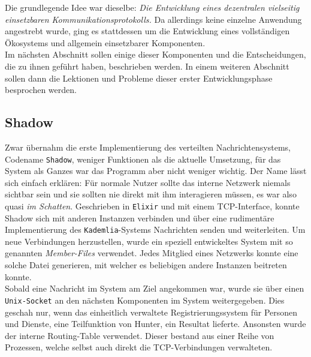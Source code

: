 \documentclass[a4paper,11pt,titlepage,twoside]{memoir}
\begin{document}
\noindent Die grundlegende Idee war dieselbe: \emph{Die Entwicklung eines
dezentralen vielseitig einsetzbaren Kommunikationsprotokolls.} Da
allerdings keine einzelne Anwendung angestrebt wurde, ging es
stattdessen um die Entwicklung eines vollständigen Ökosystems und
allgemein einsetzbarer Komponenten.\\

\noindent Im nächsten Abschnitt sollen einige dieser Komponenten und
die Entscheidungen, die zu ihnen geführt haben, beschrieben werden. In
einem weiteren Abschnitt sollen dann die Lektionen und Probleme dieser
erster Entwicklungsphase besprochen werden.
\subsection{Shadow}
\label{sec:orgc47246c}
Zwar übernahm die erste Implementierung des verteilten
Nachrichtensystems, Codename \texttt{Shadow}, weniger Funktionen als die
aktuelle Umsetzung, für das System als Ganzes war das Programm aber
nicht weniger wichtig. Der Name lässt sich einfach erklären: Für
normale Nutzer sollte das interne Netzwerk niemals sichtbar sein und
sie sollten nie direkt mit ihm interagieren müssen, es war also quasi
\emph{im Schatten}. Geschrieben in \texttt{Elixir} und mit einem TCP-Interface, konnte
Shadow sich mit anderen Instanzen verbinden und über eine rudimentäre
Implementierung des \texttt{Kademlia}-Systems Nachrichten senden und
weiterleiten. Um neue Verbindungen herzustellen, wurde ein speziell
entwickeltes System mit so genannten \emph{Member-Files} verwendet. Jedes
Mitglied eines Netzwerks konnte eine solche Datei generieren, mit
welcher es beliebigen andere Instanzen beitreten konnte.\\

\noindent Sobald eine Nachricht im System am Ziel angekommen war,
wurde sie über einen \texttt{Unix-Socket} an den nächsten Komponenten im System
weitergegeben. Dies geschah nur, wenn das einheitlich verwaltete
Registrierungssystem für Personen und Dienste, eine Teilfunktion von
Hunter, ein Resultat lieferte. Ansonsten wurde der interne
Routing-Table verwendet. Dieser bestand aus einer Reihe von Prozessen,
welche selbst auch direkt die TCP-Verbindungen verwalteten.
\end{document}
